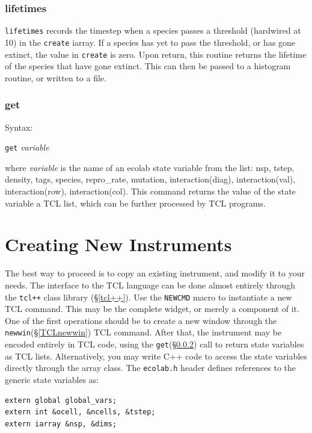 \subsubsection{lifetimes}\label{lifetimes}

\verb|lifetimes| records the timestep when a
species passes a threshold (hardwired at 10) in the {\tt create}
iarray. If a species has yet to pass the threshold, or has gone
extinct, the value in {\tt create} is zero. Upon return, this routine
returns the lifetime of the species that have gone extinct. This can
then be passed to a histogram routine, or written to a file.

\subsubsection{get}\label{TCLget}

Syntax:

{\tt get} {\em variable}

where {\em variable} is the name of an ecolab state variable from the
list: nsp, tstep, density, tags, species, repro\_rate, mutation,
interaction(diag), interaction(val), interaction(row),
interaction(col). This command returns the value of the state variable
a TCL list, which can be further processed by TCL programs.


\section{Creating New Instruments}

The best way to proceed is to copy an existing instrument, and modify it
to your needs. The interface to the TCL language can be done almost
entirely through the {\tt tcl++} class library (\S\ref{tcl++}). Use the
{\tt NEWCMD} macro to instantiate a new TCL command. This may be the
complete widget, or merely a component of it. One of the first operations
should be to create a new window through the {\tt
  newwin}(\S\ref{TCLnewwin}) TCL command. After that, the instrument may
be encoded entirely in TCL code, using the {\tt get}(\S\ref{TCLget}) call
to return state variables as TCL lists. Alternatively, you may write C++
code to access the state variables directly through the array class. The
{\tt ecolab.h} header defines references to the generic state variables
as:
\begin{verbatim}
extern global global_vars;
extern int &ocell, &ncells, &tstep;
extern iarray &nsp, &dims;
\end{verbatim}

